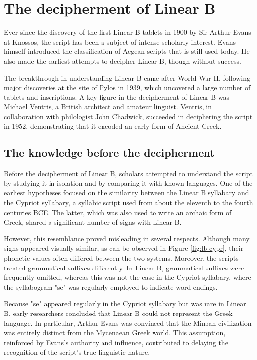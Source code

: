 \section{The decipherment of Linear B}
Ever since the discovery of the first Linear B tablets in 1900 by Sir Arthur Evans at Knossos, the script has been a subject of intense scholarly interest.
Evans himself introduced the classification of Aegean scripts that is still used today.
He also made the earliest attempts to decipher Linear B, though without success.

The breakthrough in understanding Linear B came after World War II, following major discoveries at the site of Pylos in 1939, which uncovered a large number of tablets and inscriptions.
A key figure in the decipherment of Linear B was Michael Ventris, a British architect and amateur linguist.
Ventris, in collaboration with philologist John Chadwick, succeeded in deciphering the script in 1952, demonstrating that it encoded an early form of Ancient Greek.

\subsection{The knowledge before the decipherment}

Before the decipherment of Linear B, scholars attempted to understand the script by studying it in isolation and by comparing it with known languages.  
One of the earliest hypotheses focused on the similarity between the Linear B syllabary and the Cypriot syllabary, a syllabic script used from about the eleventh to the fourth centuries BCE.  
The latter, which was also used to write an archaic form of Greek, shared a significant number of signs with Linear B.

However, this resemblance proved misleading in several respects.  
Although many signs appeared visually similar, as can be observed in Figure \ref{fig:lb-cypr}, their phonetic values often differed between the two systems.  
Moreover, the scripts treated grammatical suffixes differently.  
In Linear B, grammatical suffixes were frequently omitted, whereas this was not the case in the Cypriot syllabary, where the syllabogram "se" was regularly employed to indicate word endings.

Because "se" appeared regularly in the Cypriot syllabary but was rare in Linear B, early researchers concluded that Linear B could not represent the Greek language.  
In particular, Arthur Evans was convinced that the Minoan civilization was entirely distinct from the Mycenaean Greek world.  
This assumption, reinforced by Evans's authority and influence, contributed to delaying the recognition of the script's true linguistic nature. \cite{chad-ch2}

